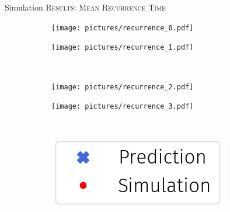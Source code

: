 \begin{frame}{Simulation}
  \centering \Large
  \textsc{Results: Mean Recurrence Time}
\end{frame}

\begin{frame}
  \begin{figure}
      \begin{subfigure}{.49\textwidth}
          \centering
          \texttt{[image: pictures/recurrence\_0.pdf]}
        \end{subfigure}
        \begin{subfigure}{.49\textwidth}
          \centering
          \texttt{[image: pictures/recurrence\_1.pdf]}
        \end{subfigure}\\
        \begin{subfigure}{0.49\textwidth}
          \centering
          \texttt{[image: pictures/recurrence\_2.pdf]}
        \end{subfigure}%
        \begin{subfigure}{0.49\textwidth}
          \centering
          \texttt{[image: pictures/recurrence\_3.pdf]}
      \end{subfigure}\\
      \begin{center}
        \begin{subfigure}{0.26\textwidth}
          \centering
          \includegraphics[width=0.9\linewidth]{pictures/legend_2.png}
        \end{subfigure}\\
      \end{center}
      \end{figure}
\end{frame}